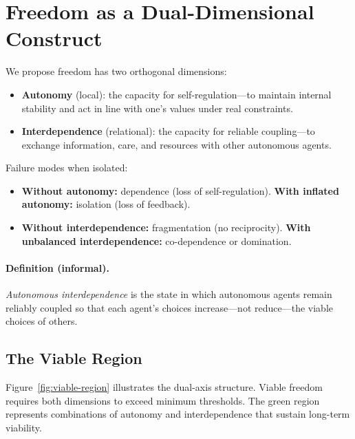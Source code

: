 \documentclass[11pt,a4paper]{article}
\begin{document}
\section{Freedom as a Dual-Dimensional Construct}

We propose freedom has two orthogonal dimensions:
\begin{itemize}
    \item \textbf{Autonomy} (local): the capacity for self-regulation---to maintain internal stability and act in line with one's values under real constraints.
    \item \textbf{Interdependence} (relational): the capacity for reliable coupling---to exchange information, care, and resources with other autonomous agents.
\end{itemize}

\noindent Failure modes when isolated:
\begin{itemize}
    \item \textbf{Without autonomy:} dependence (loss of self-regulation). \textbf{With inflated autonomy:} isolation (loss of feedback).
    \item \textbf{Without interdependence:} fragmentation (no reciprocity). \textbf{With unbalanced interdependence:} co-dependence or domination.
\end{itemize}

\paragraph{Definition (informal).}
\emph{Autonomous interdependence} is the state in which autonomous agents remain reliably coupled so that each agent's choices increase---not reduce---the viable choices of others.

\subsection{The Viable Region}

Figure~\ref{fig:viable-region} illustrates the dual-axis structure. Viable freedom requires both dimensions to exceed minimum thresholds. The green region represents combinations of autonomy and interdependence that sustain long-term viability.
\end{document}
